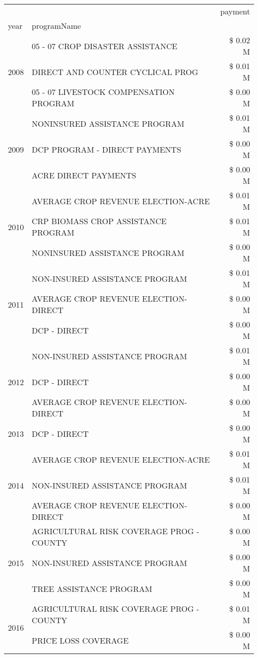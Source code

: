 \begin{tabular}{llr}
\toprule
 &  & payment \\
year & programName &  \\
\midrule
\multirow[t]{3}{*}{2008} & 05 - 07 CROP DISASTER ASSISTANCE & \$ 0.02 M \\
 & DIRECT AND COUNTER CYCLICAL PROG & \$ 0.01 M \\
 & 05 - 07 LIVESTOCK COMPENSATION PROGRAM & \$ 0.00 M \\
\cline{1-3}
\multirow[t]{3}{*}{2009} & NONINSURED ASSISTANCE PROGRAM & \$ 0.01 M \\
 & DCP PROGRAM - DIRECT PAYMENTS & \$ 0.00 M \\
 & ACRE DIRECT PAYMENTS & \$ 0.00 M \\
\cline{1-3}
\multirow[t]{3}{*}{2010} & AVERAGE CROP REVENUE ELECTION-ACRE & \$ 0.01 M \\
 & CRP BIOMASS CROP ASSISTANCE PROGRAM & \$ 0.01 M \\
 & NONINSURED ASSISTANCE PROGRAM & \$ 0.00 M \\
\cline{1-3}
\multirow[t]{3}{*}{2011} & NON-INSURED ASSISTANCE PROGRAM & \$ 0.01 M \\
 & AVERAGE CROP REVENUE ELECTION-DIRECT & \$ 0.00 M \\
 & DCP - DIRECT & \$ 0.00 M \\
\cline{1-3}
\multirow[t]{3}{*}{2012} & NON-INSURED ASSISTANCE PROGRAM & \$ 0.01 M \\
 & DCP - DIRECT & \$ 0.00 M \\
 & AVERAGE CROP REVENUE ELECTION-DIRECT & \$ 0.00 M \\
\cline{1-3}
2013 & DCP - DIRECT & \$ 0.00 M \\
\cline{1-3}
\multirow[t]{3}{*}{2014} & AVERAGE CROP REVENUE ELECTION-ACRE & \$ 0.01 M \\
 & NON-INSURED ASSISTANCE PROGRAM & \$ 0.01 M \\
 & AVERAGE CROP REVENUE ELECTION-DIRECT & \$ 0.00 M \\
\cline{1-3}
\multirow[t]{3}{*}{2015} & AGRICULTURAL RISK COVERAGE PROG - COUNTY & \$ 0.00 M \\
 & NON-INSURED ASSISTANCE PROGRAM & \$ 0.00 M \\
 & TREE ASSISTANCE PROGRAM & \$ 0.00 M \\
\cline{1-3}
\multirow[t]{3}{*}{2016} & AGRICULTURAL RISK COVERAGE PROG - COUNTY & \$ 0.01 M \\
 & PRICE LOSS COVERAGE & \$ 0.00 M \\

\end{tabular}
